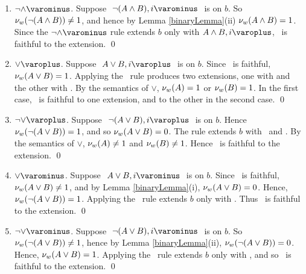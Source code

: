 \begin{proof*}
\begin{enumerate}
		\item $\uRule{ \neg\wedge }$. Suppose $ \like{ \uNode{ \neg (A \wedge B) }{ i } } $ is on $ b $.
							So $ \mathcal{\nu}_{ w }({ \neg ( A \wedge B )}) \neq 1 $, 
							and hence by Lemma \ref{binaryLemma}(ii) $ \mathcal{\nu}_{ w }({ A \wedge B }) = 1 $.
							Since the $ \uRule{\neg\wedge} $ rule extends $ b $ only with $ \dNode{ A \wedge B }{ i } $,
							\Model\ is faithful to the extension.
							\qed

		\item $\dRule{ \vee }$. 	Suppose $ \like{ \dNodei{ A \vee B } } $ is on $ b $.
							Since \Model\ is faithful, $ \mathcal{\nu}_{ w }({ A \vee B }) = 1 $.
							Applying the \dRule{ \vee }\ rule produces two extensions, one with  and the other with .
							By the semantics of $\vee$, $\mathcal{\nu}_{ w }({ A }) = 1$ or $\mathcal{\nu}_{ w }({ B }) = 1$.
							In the first case, \Model\ is faithful to one extension, and to the other in the second case.
							\qed

		\item $\dRule{ \neg\vee }$. Suppose $ \like{ \dNodei{ \neg (A \vee B) } } $ is on $ b $.
							Hence $ \mathcal{\nu}_{ w }({ \neg (A \vee B) }) = 1 $, 
							and so $ \mathcal{\nu}_{ w }({ A \vee B }) = 0 $. The \dRule{ \neg\vee } rule extends $ b $ with \ and .
							By the semantics of $ \vee $, $ \mathcal{\nu}_{ w }({A}) \neq 1 $ and $ \mathcal{\nu}_{ w }({B}) \neq 1 $.
							Hence \Model\ is faithful to the extension.
							\qed

		\item $\uRule{ \vee }$. 	Suppose $ \like{\uNodei{ A \vee B }} $ is on $ b $.
							Since \Model\ is faithful, $ \mathcal{\nu}_{ w }({ A \vee B }) \neq 1$, and by Lemma \ref{binaryLemma}(i), $ \mathcal{\nu}_{ w }({ A \vee B }) = 0 $.
							Hence, $ \mathcal{\nu}_{ w }({ \neg (A \vee B) }) = 1 $.
							Applying the \uRule{ \vee }\ rule extends $ b $ only with .
							Thus \Model\ is faithful to the extension.
							\qed

		\item $\uRule{ \neg\vee }$. Suppose $ \like{\uNodei{ \neg (A \vee B) }} $ is on $ b $.
							So $ \mathcal{\nu}_{ w }({ \neg (A \vee B ) }) \neq 1 $, hence by Lemma \ref{binaryLemma}(ii), $ \mathcal{\nu}_{ w }({ \neg (A \vee B) }) = 0 $.
							Hence, $ \mathcal{\nu}_{ w }({ A \vee B }) = 1 $.
							Applying the \uRule{ \neg \vee }\ rule extends $ b $ only with , 
							and so \Model\ is faithful to the extension.
							\qed


\end{enumerate}
\end{proof*}
